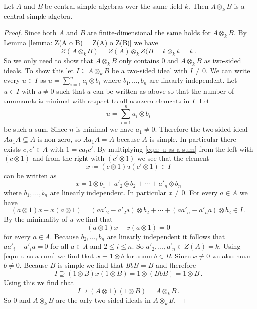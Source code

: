 \begin{proposition}
  Let $A$ and $B$ be central simple algebras over the same field $k$.
  Then $A \otimes_k B$ is a central simple algebra.
\end{proposition}
\begin{proof}
  Since both $A$ and $B$ are finite-dimensional the same holds for $A \otimes_k B$.
  By Lemma \ref{lemma: Z(A o B) = Z(A) o Z(B)} we have
  \[
      Z(A \otimes_k B)
    = Z(A) \otimes_k Z(B
    = k \otimes_k k
    = k \,.
  \]
  So we only need to show that $A \otimes_k B$ only contains $0$ and $A \otimes_k B$ as two-sided ideals.
  To show this let $I \subseteq A \otimes_k B$ be a two-sided ideal with $I \neq 0$.
  We can write every $u \in I$ as $u = \sum_{i=1}^n a_i \otimes b_i$ where $b_1, \dotsc, b_n$ are linearly independent.
  Let $u \in I$ with $u \neq 0$ such that $u$ can be written as above so that the number of summands is minimal with respect to all nonzero elements in $I$.
  Let
  \begin{equation}\label{eqn: u as a sum}
    u = \sum_{i=1}^n a_i \otimes b_i
  \end{equation}
  be such a sum.
  Since $n$ is minimal we have $a_1 \neq 0$.
  Therefore the two-sided ideal $A a_1 A \subseteq A$ is non-zero, so $A a_1 A = A$ because $A$ is simple.
  In particular there exists $c, c' \in A$ with $1 = c a_1 c'$.
  By multiplying \eqref{eqn: u as a sum} from the left with $(c \otimes 1)$ and from the right with $(c' \otimes 1)$ we see that the element
  \[
              x
    \coloneqq (c \otimes 1) u (c' \otimes 1)
    \in       I
  \]
  can be written as
  \begin{equation}\label{eqn: x as a sum}
        x
    =   1 \otimes b_1
      + a'_2 \otimes b_2
      + \dotsb
      + a'_n \otimes b_n
  \end{equation}
  where $b_1, \dotsc, b_n$ are linearly independent.
  In particular $x \neq 0$.
  For every $a \in A$ we have
  \[
        (a \otimes 1) x - x (a \otimes 1)
    =   (a a'_2 - a'_2 a) \otimes b_2
      + \dotsb
      + (a a'_n - a'_n a) \otimes b_2 \in I \,.
  \]
  By the minimality of $u$ we find that
  \[
      (a \otimes 1) x - x (a \otimes 1)
    = 0
  \]
  for every $a \in A$.
  Because $b_2, \dotsc, b_n$ are linearly independent it follows that $a a'_i - a'_i a = 0$ for all $a \in A$ and $2 \leq i \leq n$.
  So $a'_2, \dotsc, a'_n \in Z(A) = k$.
  Using \eqref{eqn: x as a sum} we find that $x = 1 \otimes b$ for some $b \in B$.
  Since $x \neq 0$ we also have $b \neq 0$.
  Because $B$ is simple we find that $BbB = B$ and therefore
  \[
              I
    \supseteq (1 \otimes B) x (1 \otimes B)
    =         1 \otimes (BbB)
    =         1 \otimes B \,.
  \]
  Using this we find that
  \[
              I
    \supseteq (A \otimes 1) (1 \otimes B)
    =         A \otimes_k B \,.
  \]
  So $0$ and $A \otimes_k B$ are the only two-sided ideals in $A \otimes_k B$.
\end{proof}
